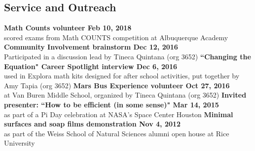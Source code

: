 \documentclass[margin,line]{res}
\begin{document}
\begin{resume}
\section{\sc Service and Outreach}
{\bf Math Counts volunteer \hfill Feb 10, 2018}\\
scored exams from Math COUNTS competition at Albuquerque Academy
\vskip -5pt
{\bf Community Involvement brainstorm \hfill Dec 12, 2016}\\
Participated in a discussion lead by Tineca Quintana (org 3652)
\vskip -5pt
{\bf ``Changing the Equation" Career Spotlight interview \hfill Dec 6, 2016}\\
used in Explora math kits designed for after school activities, put together by Amy Tapia (org 3652)
\vskip -5pt
{\bf Mars Bus Experience volunteer \hfill Oct 27, 2016}\\
at Van Buren Middle School, organized by Tineca Quintana (org 3652)
\vskip -5pt
{\bf Invited presenter: ``How to be efficient (in some sense)" \hfill Mar 14, 2015} \\
as part of a Pi Day celebration at NASA's Space Center Houston
\vskip -5pt
{\bf Minimal surfaces and soap films demonstration \hfill Nov 4, 2012} \\
as part of the Weiss School of Natural Sciences alumni open house at Rice University

\begin{comment}
\section{\sc Hobbies and Interests}
Bicycling, rock climbing, racquetball, Arduino hacks
\end{comment}


\end{resume}
\end{document}
